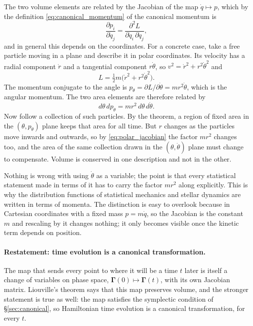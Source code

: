 \documentclass[12pt]{article}
\renewcommand{\vec}[1]{\bm{#1}}
\begin{document}
The two volume elements are related by the Jacobian of the map
$\dot q \mapsto p$, which by the definition
\eqref{eq:canonical_momentum} of the canonical momentum is
%
\begin{equation}
  \frac{\partial p_i}{\partial\dot q_j}
   = \frac{\partial^2 L}{\partial\dot q_i\,\partial\dot q_j} ,
\end{equation}
%
and in general this depends on the coordinates.  For a concrete case,
take a free particle moving in a plane and describe it in polar
coordinates.  Its velocity has a radial component $\dot r$ and a
tangential component $r\dot\theta$, so $v^2 = \dot r^2 + r^2\dot\theta^2$
and
%
\begin{equation}
  L = \tfrac12 m\bigl(\dot r^2 + r^2\dot\theta^2\bigr) .
\end{equation}
%
The momentum conjugate to the angle is
$p_\theta = \partial L/\partial\dot\theta = mr^2\dot\theta$, which is
the angular momentum.  The two area elements are therefore related by
%
\begin{equation}
  d\theta\,dp_\theta = m r^2 \, d\theta\,d\dot\theta .
  \label{eq:polar_jacobian}
\end{equation}
%
Now follow a collection of such particles.  By the theorem, a region of
fixed area in the $(\theta,p_\theta)$ plane keeps that area for all
time.  But $r$ changes as the particles move inwards and outwards, so
by \eqref{eq:polar_jacobian} the factor $mr^2$ changes too, and the
area of the same collection drawn in the $(\theta,\dot\theta)$ plane
must change to compensate.  Volume is conserved in one description and
not in the other.

Nothing is wrong with using $\dot\theta$ as a variable; the point is
that every statistical statement made in terms of it has to carry the
factor $mr^2$ along explicitly.  This is why the distribution functions
of statistical mechanics and stellar dynamics are written in terms of
momenta.  The distinction is easy to overlook because in Cartesian
coordinates with a fixed mass $p = m\dot q$, so the Jacobian is the
constant $m$ and rescaling by it changes nothing; it only becomes
visible once the kinetic term depends on position.

\paragraph{Restatement: time evolution is a canonical
transformation.}  The map that sends every point to where it will be a
time $t$ later is itself a change of variables on phase space,
$\vec\Gamma(0)\mapsto\vec\Gamma(t)$, with its own Jacobian matrix.
Liouville's theorem says that this map preserves volume, and the
stronger statement is true as well: the map satisfies the symplectic
condition of \S\ref{sec:canonical}, so Hamiltonian time evolution is a
canonical transformation, for every $t$.
\end{document}
